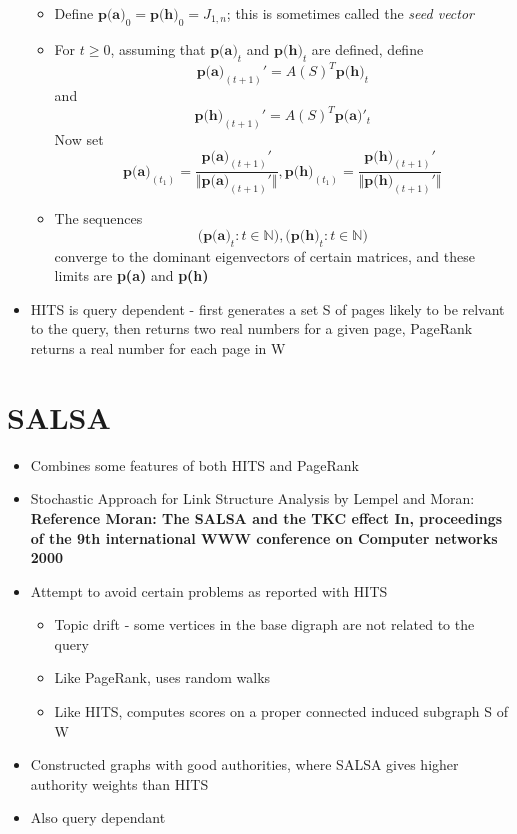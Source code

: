 \documentclass[11pt]{report}
\begin{document}
\begin{itemize}
\begin{itemize}
\item Define \(\textbf{p(a)}_0 = \textbf{p(h)}_0 = J_{1,n}\); this is sometimes called the \textit{seed vector}
\item For \(\textit{t}\geq 0\), assuming that \(\textbf{p(a)}_t\) and \(\textbf{p(h)}_t\) are defined, define \begin{equation} \textbf{p(a)}_{(t+1)}' = A(S)^T\textbf{p(h)}_t \end{equation} and \begin{equation} \textbf{p(h)}_{(t+1)}' = A(S)^T\textbf{p(a)}'_t \end{equation} Now set \begin{equation}
\textbf{p(a)}_{(t_1)} = \frac{\textbf{p(a)}_{(t+1)}'}{\Vert\textbf{p(a)}_{(t+1)}'\Vert},   \textbf{p(h)}_{(t_1)} = \frac{\textbf{p(h)}_{(t+1)}'}{\Vert\textbf{p(h)}_{(t+1)}'\Vert}
\end{equation} 
\item The sequences \begin{equation} \textbf{(p(a)}_t:t\in \mathbb{N}), \textbf{(p(h)}_t:t\in \mathbb{N})
\end{equation} converge to the dominant eigenvectors of certain matrices, and these limits are \textbf{p(a)} and \textbf{p(h)}
\end{itemize}
\item HITS is query dependent - first generates a set S of pages likely to be relvant to the query, then returns two real numbers for a given page, PageRank returns a real number for each page in W
\end{itemize}
\section{SALSA}
\begin{itemize}
\item Combines some features of both HITS and PageRank
\item Stochastic Approach for Link Structure Analysis by Lempel and Moran: \textbf{Reference Moran: The SALSA and the TKC effect In, proceedings of the 9th international WWW conference on Computer networks 2000}
\item Attempt to avoid certain problems as reported with HITS
\begin{itemize}
\item Topic drift - some vertices in the base digraph are not related to the query
\item Like PageRank, uses random walks
\item Like HITS, computes scores on a proper connected induced subgraph S of W
\end{itemize}
\item Constructed graphs with good authorities, where SALSA gives higher authority weights than HITS 
\item Also query dependant
\end{itemize}
\end{document}
